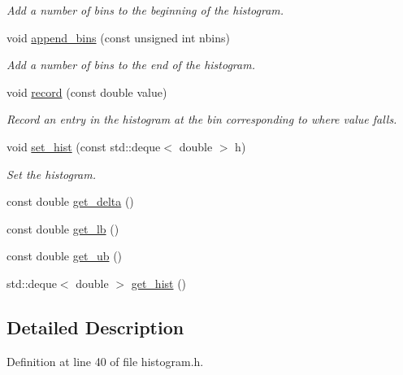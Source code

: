 \begin{DoxyCompactItemize}
\begin{DoxyCompactList}\small\item\em Add a number of bins to the beginning of the histogram. \end{DoxyCompactList}\item 
void \hyperlink{classdynamic__one__dim__histogram_a6fa516279d227e363aa90baf29f8a181}{append\-\_\-bins} (const unsigned int nbins)
\begin{DoxyCompactList}\small\item\em Add a number of bins to the end of the histogram. \end{DoxyCompactList}\item 
void \hyperlink{classdynamic__one__dim__histogram_a2ae28c147c2dfc624ece9102603dd667}{record} (const double value)
\begin{DoxyCompactList}\small\item\em Record an entry in the histogram at the bin corresponding to where value falls. \end{DoxyCompactList}\item 
void \hyperlink{classdynamic__one__dim__histogram_a6fe82d8d8f463c6ca684bf1fead1d5c3}{set\-\_\-hist} (const std\-::deque$<$ double $>$ h)
\begin{DoxyCompactList}\small\item\em Set the histogram. \end{DoxyCompactList}\item 
const double \hyperlink{classdynamic__one__dim__histogram_a36567635816c1d33b8fb6f14ac50d575}{get\-\_\-delta} ()
\item 
const double \hyperlink{classdynamic__one__dim__histogram_a3849f19cd0c77e153cf32b0acefacc4d}{get\-\_\-lb} ()
\item 
const double \hyperlink{classdynamic__one__dim__histogram_a50871ffa445bce5f4443770a18db84aa}{get\-\_\-ub} ()
\item 
std\-::deque$<$ double $>$ \hyperlink{classdynamic__one__dim__histogram_ac3903fa9339e78a5b9abe908af279b0a}{get\-\_\-hist} ()
\end{DoxyCompactItemize}


\subsection{Detailed Description}


Definition at line 40 of file histogram.\-h.



